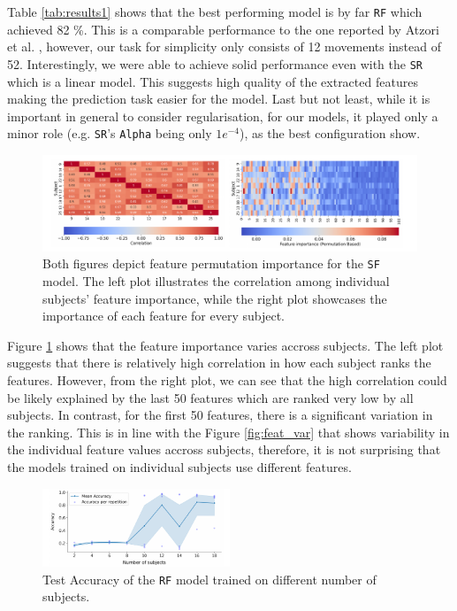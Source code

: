 \documentclass[10pt]{article}
\begin{document}
Table \ref{tab:results1} shows that the best performing model is by far \texttt{RF} which achieved 82 \%.
This is a comparable performance to the one reported by Atzori et al. \cite{ninapro},
however, our task for simplicity only consists of 12 movements instead of 52. Interestingly,
we were able to achieve solid performance even with the \texttt{SR} which is a linear model.
This suggests high quality of the extracted features making the prediction task easier for the model.
Last but not least, while it is important in general to consider 
regularisation, for our models, it played only a minor role (e.g. \texttt{SR}'s \texttt{Alpha} being only $1e^{-4}$), as the best configuration show.


\begin{figure}[h]
    \centering
    \includegraphics[width=1\textwidth]{../figures/fig_feat_imp.pdf}
    \caption{Both figures depict feature permutation importance for the \texttt{SF} 
    model. The left plot illustrates the correlation among individual subjects' feature 
    importance, while the right plot showcases the importance of each feature for every subject.}
    \label{fig:feat_imp}
\end{figure}

Figure \ref{fig:feat_imp} shows that the feature importance varies accross subjects. The left plot
suggests that there is relatively high correlation in how each subject ranks the features. However,
from the right plot, we can see that the high correlation could be likely explained by the 
last 50 features which are ranked very low by all subjects. In contrast, for the first 
50 features, there is a significant variation in the ranking. This is in line 
with the Figure \ref{fig:feat_var} that shows variability in the individual feature values
accross subjects, therefore, it is not surprising that the models trained on individual subjects
use different features.

\begin{figure}
    \centering
    \includegraphics[width=0.5\textwidth]{../figures/fig_k_vs_perf.pdf}
    \caption{Test Accuracy of the \texttt{RF} model trained on different number of subjects.}
    \label{fig:k_vs_perf}
\end{figure}
\end{document}
